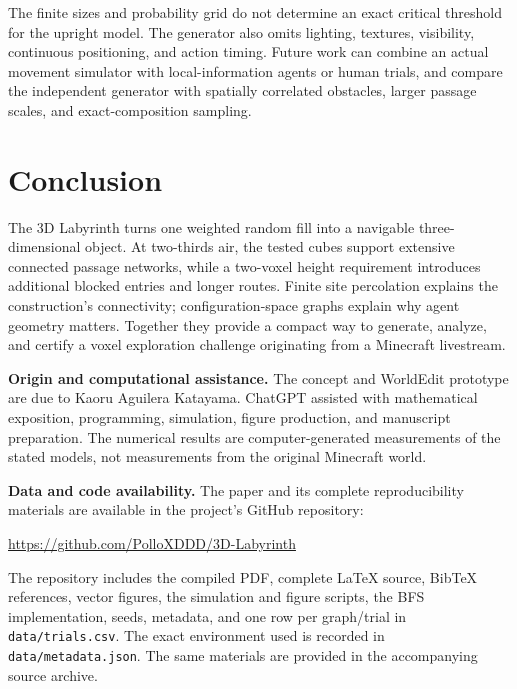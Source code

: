 \documentclass[11pt,letterpaper]{article}
\newcommand{\smallhead}[1]{\medskip\noindent\textbf{#1}\quad}
\begin{document}
The finite sizes and probability grid do not determine an exact critical
threshold for the upright model. The generator also omits lighting, textures,
visibility, continuous positioning, and action timing. Future work can combine
an actual movement simulator with local-information agents or human trials,
and compare the independent generator with spatially correlated obstacles,
larger passage scales, and exact-composition sampling.

\section{Conclusion}
The 3D Labyrinth turns one weighted random fill into a navigable three-dimensional
object. At two-thirds air, the tested cubes support extensive connected passage
networks, while a two-voxel height requirement introduces additional blocked
entries and longer routes. Finite site percolation explains the construction's
connectivity; configuration-space graphs explain why agent geometry matters.
Together they provide a compact way to generate, analyze, and certify a voxel
exploration challenge originating from a Minecraft livestream.

\smallhead{Origin and computational assistance.}
The concept and WorldEdit prototype are due to Kaoru Aguilera Katayama.
ChatGPT assisted with mathematical exposition, programming, simulation,
figure production, and manuscript preparation. The numerical results are
computer-generated measurements of the stated models, not measurements from
the original Minecraft world.

\smallhead{Data and code availability.}
The paper and its complete reproducibility materials are available in the
project's GitHub repository:
\begin{center}
\url{https://github.com/PolloXDDD/3D-Labyrinth}
\end{center}
The repository includes the compiled PDF, complete \LaTeX{} source,
Bib\TeX{} references, vector figures, the simulation and figure scripts,
the BFS implementation, seeds, metadata, and one row per graph/trial in
\texttt{data/trials.csv}. The exact environment used is recorded in
\texttt{data/metadata.json}. The same materials are provided in the
accompanying source archive.

\begingroup
{}


\endgroup

\appendix
\end{document}
